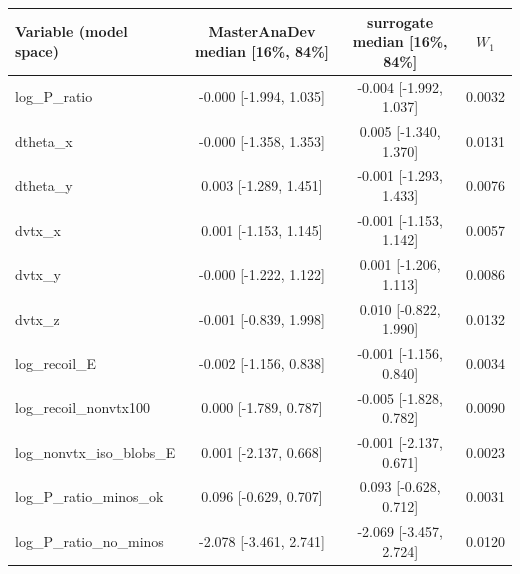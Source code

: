 \begin{tabular}{lccc}
\toprule
Variable (model space) & MasterAnaDev median [16\%, 84\%] & surrogate median [16\%, 84\%] & $W_1$ \\
\midrule
log\_P\_ratio & -0.000 [-1.994, 1.035] & -0.004 [-1.992, 1.037] & 0.0032 \\
dtheta\_x & -0.000 [-1.358, 1.353] & 0.005 [-1.340, 1.370] & 0.0131 \\
dtheta\_y & 0.003 [-1.289, 1.451] & -0.001 [-1.293, 1.433] & 0.0076 \\
dvtx\_x & 0.001 [-1.153, 1.145] & -0.001 [-1.153, 1.142] & 0.0057 \\
dvtx\_y & -0.000 [-1.222, 1.122] & 0.001 [-1.206, 1.113] & 0.0086 \\
dvtx\_z & -0.001 [-0.839, 1.998] & 0.010 [-0.822, 1.990] & 0.0132 \\
log\_recoil\_E & -0.002 [-1.156, 0.838] & -0.001 [-1.156, 0.840] & 0.0034 \\
log\_recoil\_nonvtx100 & 0.000 [-1.789, 0.787] & -0.005 [-1.828, 0.782] & 0.0090 \\
log\_nonvtx\_iso\_blobs\_E & 0.001 [-2.137, 0.668] & -0.001 [-2.137, 0.671] & 0.0023 \\
log\_P\_ratio\_minos\_ok & 0.096 [-0.629, 0.707] & 0.093 [-0.628, 0.712] & 0.0031 \\
log\_P\_ratio\_no\_minos & -2.078 [-3.461, 2.741] & -2.069 [-3.457, 2.724] & 0.0120 \\
\bottomrule
\end{tabular}
